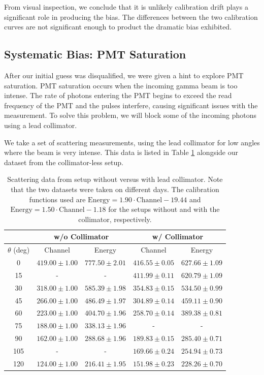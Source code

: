 \documentclass[12pt, letterpaper]{article}
\begin{document}
From visual inspection, we conclude that it is unlikely calibration drift plays a significant role in producing the bias. The differences between the two calibration curves are not significant enough to product the dramatic bias exhibited. 

\subsection{Systematic Bias: PMT Saturation}

After our initial guess was disqualified, we were given a hint to explore PMT saturation. PMT saturation occurs when the incoming gamma beam is too intense. The rate of photons entering the PMT begins to exceed the read frequency of the PMT and the pulses interfere, causing significant issues with the measurement. To solve this problem, we will block some of the incoming photons using a lead collimator. 

We take a set of scattering measurements, using the lead collimator for low angles where the beam is very intense. This data is listed in Table \ref{table:pmt-saturation} alongside our dataset from the collimator-less setup. 

\begin{table}[!h]
\footnotesize
\centering
\begin{tabular}{| c | c c | c c |}
    \cline{2-5}
    \multicolumn{1}{c|}{} & \multicolumn{2}{c|}{w/o Collimator} & \multicolumn{2}{c|}{w/ Collimator} \\
    \hline
    $\theta$ (deg) & Channel & Energy & Channel & Energy \\
    \hline
    0 & $419.00 \pm 1.00$ & $777.50 \pm 2.01$ & $416.55 \pm 0.05$ & $627.66 \pm 1.09$ \\
    15 & - & - & $411.99 \pm 0.11$ & $620.79 \pm 1.09$ \\
    30 & $318.00 \pm 1.00$ & $585.39 \pm 1.98$ & $354.83 \pm 0.15$ & $534.50 \pm 0.99$ \\
    45 & $266.00 \pm 1.00$ & $486.49 \pm 1.97$ & $304.89 \pm 0.14$ & $459.11 \pm 0.90$ \\
    60 & $223.00 \pm 1.00$ & $404.70 \pm 1.96$ & $258.70 \pm 0.14$ & $389.38 \pm 0.81$ \\
    75 & $188.00 \pm 1.00$ & $338.13 \pm 1.96$ & - & - \\
    90 & $162.00 \pm 1.00$ & $288.68 \pm 1.96$ & $189.83 \pm 0.15$ & $285.40 \pm 0.71$ \\
    105 & - & - & $169.66 \pm 0.24$ & $254.94 \pm 0.73$ \\
    120 & $124.00 \pm 1.00$ & $216.41 \pm 1.95$ & $151.98 \pm 0.23$ & $228.26 \pm 0.70$ \\
    \hline
\end{tabular}
\caption{Scattering data from setup without versus with lead collimator. Note that the two datasets were taken on different days. The calibration functions used are $\text{Energy} = 1.90 \cdot \text{Channel}-19.44$ and $\text{Energy} = 1.50 \cdot \text{Channel}-1.18$ for the setups without and with the collimator, respectively.}
\label{table:pmt-saturation}
\end{table}
\end{document}
